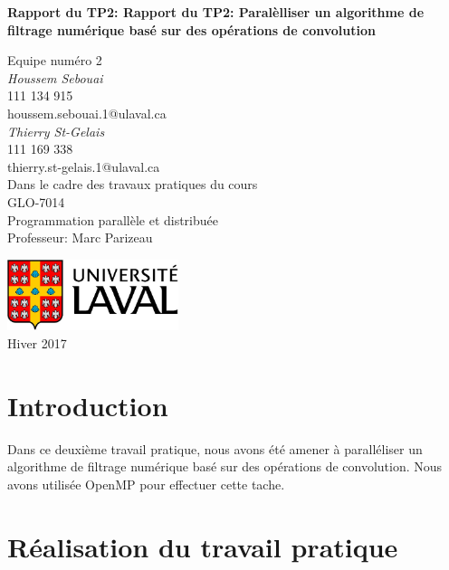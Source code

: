 \documentclass{report}
\begin{document}
\renewcommand{\labelitemi}{$\bullet$}
\renewcommand{\labelitemii}{$\circ$}
\thispagestyle{empty}

\begin{center}
	\vspace*{1cm}
	\huge  \bf Rapport du TP2: Rapport du TP2: Paralèlliser un algorithme de filtrage numérique basé
	sur des opérations de convolution\\
	\vspace{1cm}

	\LARGE Equipe numéro 2\\
	\vspace{1.5cm}
	\normalsize
	\textit{Houssem Sebouai}\\
	111 134 915\\
	houssem.sebouai.1@ulaval.ca\\

  \vspace{1cm}
	\normalsize
	\textit{Thierry St-Gelais}\\
111 169 338\\
thierry.st-gelais.1@ulaval.ca\\

	\vspace{2cm}
	Dans le cadre des travaux pratiques du cours\\
	\LARGE GLO-7014\\
	\large Programmation parallèle et distribuée\\
	Professeur: Marc Parizeau

	\vfill
	\includegraphics[width=5cm]{Images/logo.jpg}
	\\
	Hiver 2017
\end{center}

\newpage

\tableofcontents
\listoffigures
\listoftables
\newpage
\chapter{Introduction}
Dans ce deuxième travail pratique, nous avons été amener à paralléliser un algorithme
de filtrage numérique basé sur des opérations de convolution. Nous avons utilisée OpenMP
pour effectuer cette tache.
\chapter{Réalisation du travail pratique}
\end{document}
